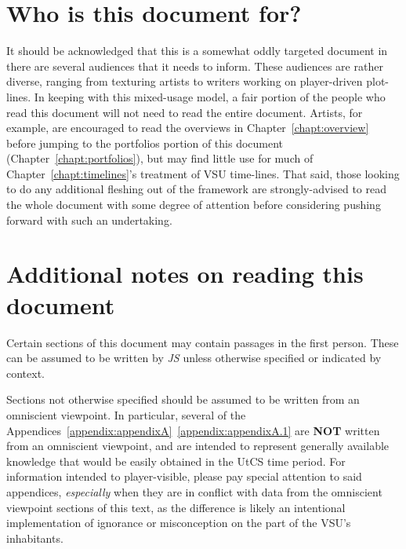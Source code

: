 \section*{Who is this document for?}
It should be acknowledged that this is a somewhat oddly targeted
document in there are several audiences that it needs to inform. These
audiences are rather diverse, ranging from texturing artists to
writers working on player-driven plot-lines. In keeping with this
mixed-usage model, a fair portion of the people who read this document
will not need to read the entire document. Artists, for example, are
encouraged to read the overviews in Chapter~\ref{chapt:overview}
before jumping to the portfolios portion of this document
(Chapter~\ref{chapt:portfolios}), but may find little use for much of
Chapter~\ref{chapt:timelines}'s treatment of VSU time-lines. That said,
those looking to do any additional fleshing out of the framework are
strongly-advised to read the whole document with some degree of
attention before considering pushing forward with such an undertaking.

\section*{Additional notes on reading this document}
Certain sections of this document may contain passages in the first
person. These can be assumed to be written by {\it JS} unless
otherwise specified or indicated by context. 

Sections not otherwise
specified should be assumed to be written from an omniscient
viewpoint. In particular, several of the Appendices~\ref{appendix:appendixA}~\ref{appendix:appendixA.1} are {\bf NOT}
written from an omniscient viewpoint, and are intended to represent
generally available knowledge that would be easily obtained in the
UtCS time period. For information intended to player-visible, please
pay special attention to said appendices, {\it especially} when they
are in conflict with data from the omniscient viewpoint sections of
this text, as the difference is likely an intentional implementation
of ignorance or misconception on the part of the VSU's inhabitants.

